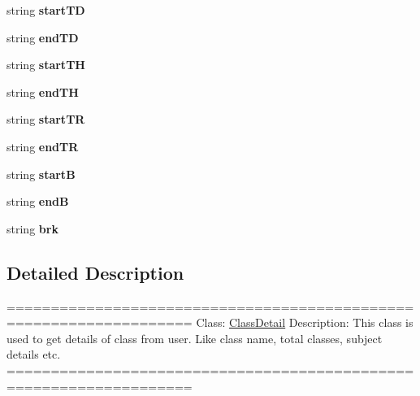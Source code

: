 \begin{DoxyCompactItemize}
\item 
\hypertarget{classPageStructureMaker_a7e458e675a3adf987a153e08f3795941}{string {\bfseries start\-T\-D}}\label{classPageStructureMaker_a7e458e675a3adf987a153e08f3795941}

\item 
\hypertarget{classPageStructureMaker_ad27f03939a04048a03be0f1bb8edd38a}{string {\bfseries end\-T\-D}}\label{classPageStructureMaker_ad27f03939a04048a03be0f1bb8edd38a}

\item 
\hypertarget{classPageStructureMaker_a4fe234b016efcb9eaa757879b8858190}{string {\bfseries start\-T\-H}}\label{classPageStructureMaker_a4fe234b016efcb9eaa757879b8858190}

\item 
\hypertarget{classPageStructureMaker_aa244b4ef71850dc76fcfb5157bcaf8fc}{string {\bfseries end\-T\-H}}\label{classPageStructureMaker_aa244b4ef71850dc76fcfb5157bcaf8fc}

\item 
\hypertarget{classPageStructureMaker_aa59b4949d26fab5a72710fa9fc3e8ea9}{string {\bfseries start\-T\-R}}\label{classPageStructureMaker_aa59b4949d26fab5a72710fa9fc3e8ea9}

\item 
\hypertarget{classPageStructureMaker_afee49ebdcbc0971142fcf7eae8baa306}{string {\bfseries end\-T\-R}}\label{classPageStructureMaker_afee49ebdcbc0971142fcf7eae8baa306}

\item 
\hypertarget{classPageStructureMaker_aa0f624b485f07f6e19151b1df3dc59a3}{string {\bfseries start\-B}}\label{classPageStructureMaker_aa0f624b485f07f6e19151b1df3dc59a3}

\item 
\hypertarget{classPageStructureMaker_ad46c3195310a1f0226e21d2eb5befb00}{string {\bfseries end\-B}}\label{classPageStructureMaker_ad46c3195310a1f0226e21d2eb5befb00}

\item 
\hypertarget{classPageStructureMaker_a63911cb925ccdc6c879905a677ed8881}{string {\bfseries brk}}\label{classPageStructureMaker_a63911cb925ccdc6c879905a677ed8881}

\end{DoxyCompactItemize}


\subsection{Detailed Description}
=================================================================== Class\-: \hyperlink{classClassDetail}{Class\-Detail} Description\-: This class is used to get details of class from user. Like class name, total classes, subject details etc. =================================================================== 

